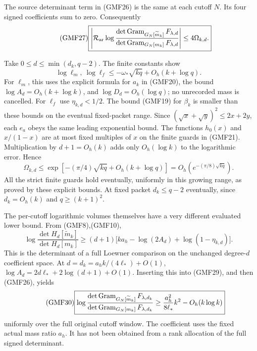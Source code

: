 \documentclass[11pt,a4paper]{article}
\begin{document}
The source determinant term in (GMF26) is the same at
each cutoff \(N\).  Its four signed coefficients sum to zero.
Consequently
\begin{equation}\tag{GMF27}
 \boxed{
 \left|\mathcal R_{\rm ar}
 \log\frac{\det\operatorname{Gram}_{G_N[\widetilde m_k]}F_{\lambda,d}}
              {\det\operatorname{Gram}_{G_N[m_k]}F_{\lambda,d}}
 \right|\le4\Omega_{k,d}.}
\end{equation}

Take \(0\le d\le\min(d_k,q-2)\).
The finite constants show
\[
 \log\ell_m,\ \log\ell_f
 \le-\omega_*\sqrt{kq}+O_h(k+\log q).
\]
For \(\ell_m\), this uses the explicit formula for \(a_k\)
in (GMF20), the bound \(\log A_d=O_h(k+\log k)\), and
\(\log D_d=O_h(\log q)\); no unrecorded mass is cancelled.
For \(\ell_f\) use \(\eta_{k,d}<1/2\).
The bound (GMF19) for \(\beta_k\) is smaller than these
bounds on the eventual fixed-packet range.
Since \((\sqrt x+\sqrt y)^2\le2x+2y\), each \(e_a\) obeys
the same leading exponential bound.  The functions
\(h_0(x)\) and \(x/(1-x)\) are at most fixed multiples
of \(x\) on the finite guards in (GMF21).
Multiplication by \(d+1=O_h(k)\) adds only \(O_h(\log k)\)
to the logarithmic error.  Hence
\begin{equation}\tag{GMF28}
 \Omega_{k,d}\le
 \exp[-(\pi/4)\sqrt{kq}+O_h(k+\log q)]
 =O_h(e^{-(\pi/8)\sqrt{kq}}).
\end{equation}
All the strict finite guards hold eventually, uniformly in
this growing range, as proved by these explicit bounds.
At fixed packet \(d_k\le q-2\) eventually, since \(d_k=O_h(k)\)
and \(q\ge(k+1)^2\).

The per-cutoff logarithmic volumes themselves have a very
different evaluated lower bound.  From (GMF8),(GMF10),
\begin{equation}\tag{GMF29}
 \log\frac{\det H_d[\widetilde m_k]}{\det H_d[m_k]}
 \ge(d+1)\bigl[
 ka_h-\log(2A_d)+\log(1-\eta_{k,d})\bigr].
\end{equation}
This is the determinant of a full Loewner comparison on
the unchanged degree-\(d\) coefficient space.
At \(d=d_k=a_hk/(4\ell_*)+O(1)\),
\(\log A_d=2d\ell_*+2\log(d+1)+O(1)\).
Inserting this into (GMF29), and then (GMF26), yields
\begin{equation}\tag{GMF30}
 \boxed{
 \log\frac{\det\operatorname{Gram}_{G_N[\widetilde m_k]}F_{\lambda,d_k}}
              {\det\operatorname{Gram}_{G_N[m_k]}F_{\lambda,d_k}}
 \ge\frac{a_h^2}{8\ell_*}k^2-O_h(k\log k)}
\end{equation}
uniformly over the full original cutoff window.
The coefficient uses the fixed actual mass ratio \(a_h\).
It has not been obtained from a rank allocation of the
full signed determinant.
\end{document}
